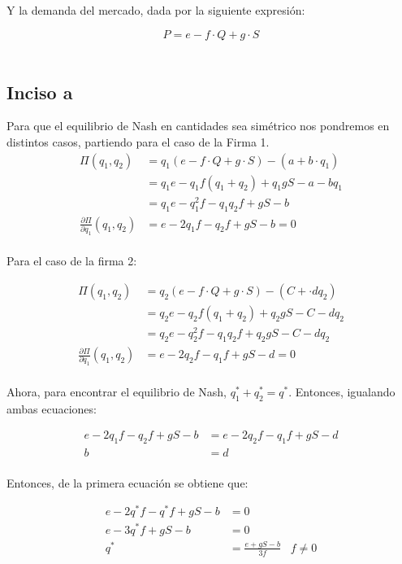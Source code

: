 \documentclass[
	spanish, %
	letterpaper, oneside
]{article}
\begin{document}
Y la demanda del mercado, dada por la siguiente expresión:

	$$P = e - f\cdot Q + g\cdot S$$\\

\subsection{Inciso a}

Para que el equilibrio de Nash en cantidades sea simétrico nos pondremos en distintos casos, partiendo para el caso de la Firma 1. \\

	\begin{align*}
		  \Pi(q_1,q_2) &= q_1(e-f\cdot Q + g\cdot S)-(a+b\cdot q_1)\\
		  						&= q_1 e - q_1 f(q_1 + q_2) + q_1 gS - a - bq_1\\
		  						&= q_1 e - q_{1}^{2} f - q_1 q_2 f + gS - b\\
		  \frac{\partial \Pi}{\partial q_1}(q_1, q_2) &= e - 2q_1 f-q_2 f + gS-b = 0
	\end{align*}\\

Para el caso de la firma 2:

	\begin{align*}
		  \Pi(q_1,q_2) &= q_2(e-f\cdot Q + g\cdot S)-(C + \cdot dq_2)\\
		  						&= q_2 e - q_2 f(q_1 + q_2) + q_2 gS - C - dq_2\\
		  						&= q_2 e - q_{2}^{2} f - q_1 q_{2}f + q_2 gS - C - dq_2\\
		  \frac{\partial \Pi}{\partial q_1}(q_1, q_2) &= e - 2q_2 f-q_1 f + gS-d = 0
	\end{align*}\\

Ahora, para encontrar el equilibrio de Nash, $q_{1}^{*} + q_{2}^{*} = q^{*}$. Entonces, igualando ambas ecuaciones:

	\begin{align*}
		   e - 2q_1 f-q_2 f + gS-b &= e - 2q_2 f-q_1 f + gS-d\\
		  b &= d
	\end{align*}\\

Entonces, de la primera ecuación se obtiene que:

	\begin{align*}
		  e-2q^* f - q^* f + gS - b &= 0\\
		  e - 3q^{*} f + gS - b &= 0\\
		  q^* &=\frac{e + gS - b}{3f}\;\;\; f \neq 0
	\end{align*}\\
\end{document}
